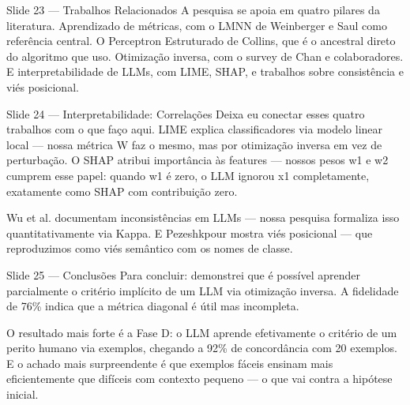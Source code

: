\documentclass[aspectratio=169, 14pt]{beamer}
\begin{document}
\begin{frame}{Slide 23 — Trabalhos Relacionados}
  A pesquisa se apoia em quatro pilares da literatura. Aprendizado de métricas, com o LMNN de Weinberger e Saul como referência central. O Perceptron Estruturado de Collins, que é o ancestral direto do algoritmo que uso. Otimização inversa, com o survey de Chan e colaboradores. E interpretabilidade de LLMs, com LIME, SHAP, e trabalhos sobre consistência e viés posicional.
\end{frame}

\begin{frame}{Slide 24 — Interpretabilidade: Correlações}
  Deixa eu conectar esses quatro trabalhos com o que faço aqui. LIME explica classificadores via modelo linear local — nossa métrica W faz o mesmo, mas por otimização inversa em vez de perturbação. O SHAP atribui importância às features — nossos pesos w1 e w2 cumprem esse papel: quando w1 é zero, o LLM ignorou x1 completamente, exatamente como SHAP com contribuição zero.

  Wu et al. documentam inconsistências em LLMs — nossa pesquisa formaliza isso quantitativamente via Kappa. E Pezeshkpour mostra viés posicional — que reproduzimos como viés semântico com os nomes de classe.
\end{frame}

\begin{frame}{Slide 25 — Conclusões}
  Para concluir: demonstrei que é possível aprender parcialmente o critério implícito de um LLM via otimização inversa. A fidelidade de 76\% indica que a métrica diagonal é útil mas incompleta.

  O resultado mais forte é a Fase D: o LLM aprende efetivamente o critério de um perito humano via exemplos, chegando a 92\% de concordância com 20 exemplos. E o achado mais surpreendente é que exemplos fáceis ensinam mais eficientemente que difíceis com contexto pequeno — o que vai contra a hipótese inicial.
\end{frame}
\end{document}

